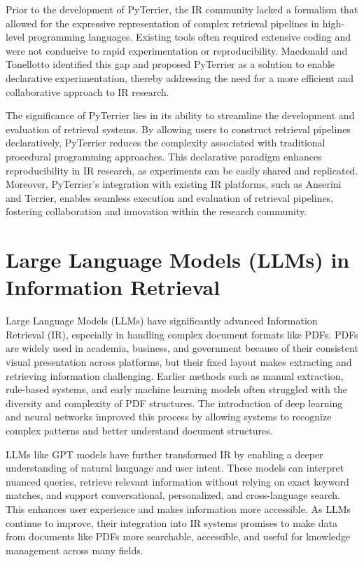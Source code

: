 Prior to the development of PyTerrier, the IR community lacked a formalism that allowed for the expressive representation of complex retrieval pipelines in high-level programming languages. Existing tools often required extensive coding and were not conducive to rapid experimentation or reproducibility. Macdonald and Tonellotto identified this gap and proposed PyTerrier as a solution to enable declarative experimentation, thereby addressing the need for a more efficient and collaborative approach to IR research.

The significance of PyTerrier lies in its ability to streamline the development and evaluation of retrieval systems. By allowing users to construct retrieval pipelines declaratively, PyTerrier reduces the complexity associated with traditional procedural programming approaches. This declarative paradigm enhances reproducibility in IR research, as experiments can be easily shared and replicated. Moreover, PyTerrier's integration with existing IR platforms, such as Anserini and Terrier, enables seamless execution and evaluation of retrieval pipelines, fostering collaboration and innovation within the research community.

\section{Large Language Models (LLMs) in Information Retrieval}

Large Language Models (LLMs) have significantly advanced Information Retrieval (IR), especially in handling complex document formats like PDFs. PDFs are widely used in academia, business, and government because of their consistent visual presentation across platforms, but their fixed layout makes extracting and retrieving information challenging. Earlier methods such as manual extraction, rule-based systems, and early machine learning models often struggled with the diversity and complexity of PDF structures. The introduction of deep learning and neural networks improved this process by allowing systems to recognize complex patterns and better understand document structures.

LLMs like GPT models have further transformed IR by enabling a deeper understanding of natural language and user intent. These models can interpret nuanced queries, retrieve relevant information without relying on exact keyword matches, and support conversational, personalized, and cross-language search. This enhances user experience and makes information more accessible. As LLMs continue to improve, their integration into IR systems promises to make data from documents like PDFs more searchable, accessible, and useful for knowledge management across many fields.


